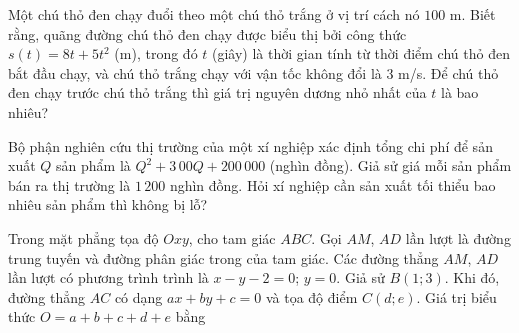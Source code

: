 \begin{ex}%
	Một chú thỏ đen chạy đuổi theo một chú thỏ trắng ở vị trí cách nó $100$ m. Biết rằng, quãng đường chú thỏ đen chạy được biểu thị bởi công thức $s(t)=8t+5t^2$ (m), trong đó $t$ (giây) là thời gian tính từ thời điểm chú thỏ đen bắt đầu chạy, và chú thỏ trắng chạy với vận tốc không đổi là $3$ m/s. Để chú thỏ đen chạy trước chú thỏ trắng thì giá trị nguyên dương nhỏ nhất của $t$ là bao nhiêu?
	\loigiai{
	
	}
\end{ex}

\begin{ex}%
	Bộ phận nghiên cứu thị trường của một xí nghiệp xác định tổng chi phí để sản xuất $Q$ sản phẩm là $Q^2+3\,00Q+200\,000$ (nghìn đồng). Giả sử giá mỗi sản phẩm bán ra thị trường là $1\,200$ nghìn đồng. Hỏi xí nghiệp cần sản xuất tối thiểu bao nhiêu sản phẩm thì không bị lỗ?
	
	\loigiai{
	
	}
\end{ex}

\begin{ex}%
	{
}
	\loigiai{
	
	}
\end{ex}

\begin{ex}%
	Trong mặt phẳng tọa độ $Oxy$, cho tam giác $ABC$. Gọi $AM$, $AD$ lần lượt là đường trung tuyến và đường phân giác trong của tam giác. Các đường thẳng $AM$, $AD$ lần lượt có phương trình trình là $x-y-2=0$; $y=0$. Giả sử $B(1;3)$. Khi đó, đường thẳng $AC$ có dạng $ax+by+c=0$ và tọa độ điểm $C\left(d;e\right)$. Giá trị biểu thức $O=a+b+c+d+e$ bằng
	\loigiai{
		
	}
\end{ex}
